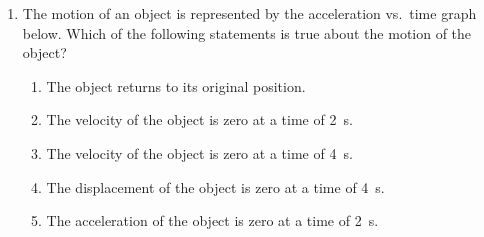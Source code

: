 \documentclass{../../oss-apphys}
\begin{document}
\begin{multicols}{2}
\begin{enumerate}[resume,leftmargin=18pt]
  \item The motion of an object is represented by the acceleration vs.\ time
    graph below. Which of the following statements is true about the
    motion of the object?
    \begin{center}
    \end{center}
    \begin{enumerate}[noitemsep,topsep=0pt,leftmargin=18pt,label=(\Alph*)]
    \item The object returns to its original position.
    \item The velocity of the object is zero at a time of \SI{2}{\second}.
    \item The velocity of the object is zero at a time of \SI{4}{\second}.
    \item The displacement of the object is zero at a time of \SI{4}{\second}.
    \item The acceleration of the object is zero at a time of \SI{2}{\second}.
    \end{enumerate}
   

\end{enumerate}
\end{multicols}
\end{document}
